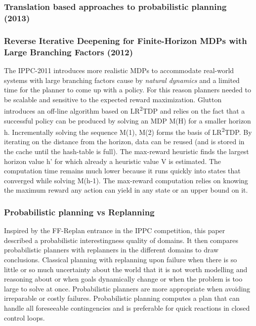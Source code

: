 \documentclass[runningheads,a4paper]{llncs}
\begin{document}
\subsubsection{Translation based approaches to probabilistic planning (2013)~\cite{taig2013translation}}

\subsubsection{Reverse Iterative Deepening for Finite-Horizon MDPs with Large Branching Factors (2012)~\cite{kolobov2012glutton}}
The IPPC-2011 introduces more realistic MDPs to accommodate real-world systems with large branching factors cause by \emph{natural dynamics} and a limited time for the planner to come up with a policy. For this reason planners needed to be scalable and sensitive to the expected reward maximization. Glutton introduces an off-line algorithm based on LR\textsuperscript{2}TDP and relies on the fact that a successful policy can be produced by solving an MDP M(H) for a smaller horizon h.  Incrementally solving the sequence M(1), M(2) forms the basis of LR\textsuperscript{2}TDP. By iterating on the distance from the horizon, data can be reused (and is stored in the cache until the hash-table is full). The max-reward heuristic finds the largest horizon value h' for which already a heuristic value V is estimated. The  computation time remains much lower because it runs quickly into states that converged while solving M(h-1). The max-reward computation relies on knowing the maximum reward any action can yield in any state or an upper bound on it.


\subsubsection{Probabilistic planning vs Replanning}
Inspired by the FF-Replan entrance in the IPPC competition, this paper described a probabilistic interestingness quality of domains. It then compares probabilistic planners with replanners in the different domains to draw conclusions. Classical planning with replanning upon failure when there is so little or so much uncertainty about the world that it is not worth modelling and reasoning about or when goals dynamically change or when the problem is too large to solve at once. Probabilistic planners are more appropriate when avoiding irreparable or costly failures. Probabilistic planning computes a plan that can handle all foreseeable contingencies and is preferable for quick reactions in closed control loops.
\end{document}
